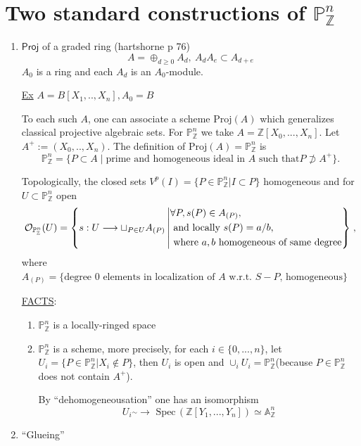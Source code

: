 \documentclass[11pt]{article}
\theoremstyle{definition}
\newcommand{\spec}{\text{ Spec}\,}
\newcommand{\affn}{\mathbb A}
\newcommand{\proj}{\mathbb P}
\newcommand{\intg}{\mathbb Z}
\newcommand{\calo}{{\cal O}}
\newcommand{\notsupset}{\not \supset}
\newcommand{\lrta}{\longrightarrow}
\begin{document}
\section*{Two standard constructions of $\proj^n_\intg$}
\begin{enumerate}[label=(\arabic*)]
\item $\mathsf{Proj}$ of a graded ring (hartshorne p 76)
$$
A=\oplus_{d\geq 0} A_d, ~A_d A_e\subset A_{d+e}
$$
$A_0$ is a ring and each $A_d$ is an $A_0$-module.

\underline{Ex} $A=B[X_1,..,X_n],A_0=B$

To each such $A$, one can associate a scheme $\text{Proj}(A)$ which generalizes classical projective algebraic sets. For $\proj^n_\intg$ we take $A=\intg[X_0,...,X_n]$. Let $A^+:=(X_0,..,X_n)$. The definition of $\text{Proj}(A)=\proj^n_\intg$ is 
$$
\proj^n_\intg=\{P\subset A\mid \text{prime and homogeneous ideal in $A$ such that} P\notsupset A^+\}.
$$

Topologically, the closed sets $V^p(I)=\{P\in\proj^n_\intg|I \subset P\}$ homogeneous and for $U\subset \proj^n_\intg$ open
$$
\calo_{\proj_\intg^n}(U)=\left\{
s:U\lrta \sqcup_{P\in U}A_{(P)}\left| \begin{aligned} &\forall P, s(P)\in A_{(P)},\\
&\text{ and  locally } s(P)=a/b,\\
& \text{ where } a,b \text{ homogeneous  of same degree}
\end{aligned}
\right\}
\right.,
$$
where $A_{(P)}=\{\text{degree $0$ elements in localization of $A$ w.r.t. $S-P$, homogeneous}\}$

\underline{FACTS}:
\begin{enumerate}
\item $\proj^n_\intg$ is  a locally-ringed space
\item $\proj^n_\intg$ is a scheme, more precisely, for each $i\in \{0,...,n\}$, let $U_i=\{P\in \proj^n_\intg|X_i\notin P\}$, then $U_i$ is open and $\cup_i U_i =\proj^n_\intg$(because $P\in \proj^n_\intg$ does not contain $A^+$).

By ``dehomogeneousation'' one has an isomorphism
$$
U_i\overset{\sim}{}\lrta 
\spec(\intg[Y_1,...,Y_n])\simeq \affn^n_\intg$$
\end{enumerate}
\item ``Glueing''

        

\begin{tikzpicture}[x=0.75pt,y=0.75pt,yscale=-1,xscale=1]


\end{tikzpicture}
\end{enumerate}
\end{document}
